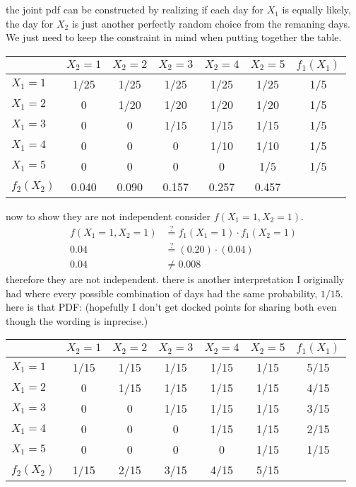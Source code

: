 \documentclass{article}
\begin{document}
\vspace{2em}
\noindent\makebox[\linewidth]{\rule{\textwidth}{0.4pt}}
\vspace{2em}

\section{}
the joint pdf can be constructed by realizing if each day for $X_1$ is equally likely, the day for $X_2$ is just another perfectly random choice from the remaning days. We just need to keep the constraint in mind when putting together the table. 
\begin{table}[ht]
    \centering
    \begin{tabular}{lccccc|c}
    \toprule
    & $X_2=1$ & $X_2=2$ & $X_2=3$ & $X_2=4$ & $X_2=5$ & $f_1(X_1)$ \\
    \midrule
    $X_1 = 1$ & 1/25 & 1/25 & 1/25 & 1/25 & 1/25 & 1/5 \\
    $X_1 = 2$ & 0 & 1/20 & 1/20 & 1/20 & 1/20 & 1/5 \\
    $X_1 = 3$ & 0 & 0 & 1/15 & 1/15 & 1/15 & 1/5 \\
    $X_1 = 4$ & 0 & 0 & 0 & 1/10 & 1/10 & 1/5 \\
    $X_1 = 5$ & 0 & 0 & 0 & 0 & 1/5 & 1/5 \\
    \midrule
    $f_2(X_2)$ & 0.040 & 0.090 & 0.157 & 0.257 & 0.457 & \\
    \bottomrule
    \end{tabular}
\end{table}
\noindent
now to show they are not independent consider $f(X_1=1, X_2=1)$.
\begin{align*}
    f(X_1=1, X_2=1) &\stackrel{?}{=} f_1(X_1 = 1) \cdot f_1(X_2=1) \\
    0.04 &\stackrel{?}{=} (0.20) \cdot (0.04) \\
    0.04 &\neq 0.008
\end{align*}
therefore they are not independent. there is another interpretation I originally had where every possible combination of days had the same probability, $1/15$. here is that PDF: (hopefully I don't get docked points for sharing both even though the wording is inprecise.)
\begin{table}[H]
    \centering
    \begin{tabular}{lccccc|c}
    \toprule
    & $X_2=1$ & $X_2=2$ & $X_2=3$ & $X_2=4$ & $X_2=5$ & $f_1(X_1)$ \\
    \midrule
    $X_1 = 1$ & 1/15 & 1/15 & 1/15 & 1/15 & 1/15 & 5/15 \\
    $X_1 = 2$ & 0 & 1/15 & 1/15 & 1/15 & 1/15 & 4/15 \\
    $X_1 = 3$ & 0 & 0 & 1/15 & 1/15 & 1/15 & 3/15 \\
    $X_1 = 4$ & 0 & 0 & 0 & 1/15 & 1/15 & 2/15 \\
    $X_1 = 5$ & 0 & 0 & 0 & 0 & 1/15 & 1/15 \\
    \midrule
    $f_2(X_2)$ & 1/15 & 2/15 & 3/15 & 4/15 & 5/15 & \\
    \bottomrule
    \end{tabular}
\end{table}
\end{document}
